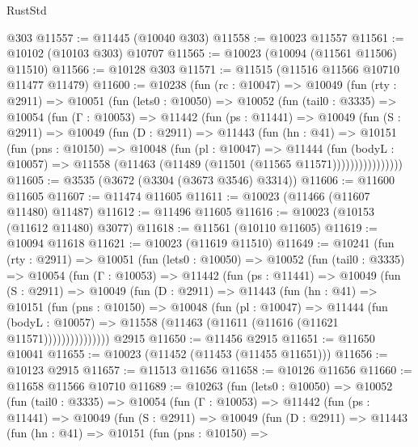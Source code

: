 \begin{lexlean}{RustStd}
\begin{coremodule}
    @303
@11557 := @11445 (@10040 @303)
@11558 := @10023 @11557
@11561 := @10102 (@10103 @303) @10707
@11565 := @10023 (@10094 (@11561 @11506) @11510)
@11566 := @10128 @303
@11571 := @11515 (@11516 @11566 @10710 @11477 @11479)
@11600 := @10238
    (fun (rc : @10047) =>
    @10049
      (fun (rty : @2911) =>
      @10051
        (fun (lets0 : @10050) =>
        @10052
          (fun (tail0 : @3335) =>
          @10054
            (fun (Γ : @10053) =>
            @11442
              (fun (ps : @11441) =>
              @10049
                (fun (S : @2911) =>
                @10049
                  (fun (D : @2911) =>
                  @11443
                    (fun (hn : @41) =>
                    @10151
                      (fun (pns : @10150) =>
                      @10048
                        (fun (pl : @10047) =>
                        @11444
                          (fun (bodyL : @10057) =>
                          @11558 (@11463 (@11489 (@11501 (@11565 @11571))))))))))))))))
@11605 := @3535 (@3672 (@3304 (@3673 @3546) @3314))
@11606 := @11600 @11605
@11607 := @11474 @11605
@11611 := @10023 (@11466 (@11607 @11480) @11487)
@11612 := @11496 @11605
@11616 := @10023 (@10153 (@11612 @11480) @3077)
@11618 := @11561 (@10110 @11605)
@11619 := @10094 @11618
@11621 := @10023 (@11619 @11510)
@11649 := @10241
    (fun (rty : @2911) =>
    @10051
      (fun (lets0 : @10050) =>
      @10052
        (fun (tail0 : @3335) =>
        @10054
          (fun (Γ : @10053) =>
          @11442
            (fun (ps : @11441) =>
            @10049
              (fun (S : @2911) =>
              @10049
                (fun (D : @2911) =>
                @11443
                  (fun (hn : @41) =>
                  @10151
                    (fun (pns : @10150) =>
                    @10048
                      (fun (pl : @10047) =>
                      @11444
                        (fun (bodyL : @10057) =>
                        @11558 (@11463 (@11611 (@11616 (@11621 @11571)))))))))))))))
    @2915
@11650 := @11456 @2915
@11651 := @11650 @10041
@11655 := @10023 (@11452 (@11453 (@11455 @11651)))
@11656 := @10123 @2915
@11657 := @11513 @11656
@11658 := @10126 @11656
@11660 := @11658 @11566 @10710
@11689 := @10263
    (fun (lets0 : @10050) =>
    @10052
      (fun (tail0 : @3335) =>
      @10054
        (fun (Γ : @10053) =>
        @11442
          (fun (ps : @11441) =>
          @10049
            (fun (S : @2911) =>
            @10049
              (fun (D : @2911) =>
              @11443
                (fun (hn : @41) =>
                @10151
                  (fun (pns : @10150) =>

\end{coremodule}
\end{lexlean}
